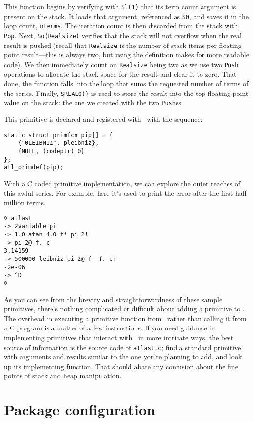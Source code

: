 \documentclass[twocolumn]{article}
\begin{document}
This function begins by verifying with {\tt Sl(1)} that its term count
argument is present on the stack.  It loads that argument, referenced
as {\tt S0}, and saves it in the loop count, {\tt nterms}.  The
iteration count is then discarded from the stack with {\tt Pop}.
Next, {\tt So(Realsize)} verifies that the stack will not overflow
when the real result is pushed (recall that {\tt Realsize} is the
number of stack items per floating point result---this is always two,
but using the definition makes for more readable code).  We then
immediately count on {\tt Realsize} being two as we use two {\tt Push}
operations to allocate the stack space for the result and clear it to
zero.  That done, the function falls into the loop that sums the
requested number of terms of the series.  Finally, {\tt SREAL0()} is
used to store the result into the top floating point value on the
stack: the one we created with the two {\tt Push}es.

This primitive is declared and registered with \atlast\ with the
sequence:

\begin{verbatim}
static struct primfcn pip[] = {
    {"0LEIBNIZ", pleibniz},
    {NULL, (codeptr) 0}
};
atl_primdef(pip);
\end{verbatim}

With a C coded primitive implementation, we can explore the outer
reaches of this awful series.  For example, here it's used to print
the error after the first half million terms.

\begin{verbatim}
% atlast
-> 2variable pi
-> 1.0 atan 4.0 f* pi 2!
-> pi 2@ f. c 
3.14159
-> 500000 leibniz pi 2@ f- f. cr
-2e-06
-> ^D
%
\end{verbatim}

As you can see from the brevity and straightforwardness of these
sample
primitives, there's nothing complicated or difficult about adding a
primitive to \atlast .  The overhead in executing a primitive
function from \atlast\ rather than calling it from a C program is a
matter of a few instructions.  If you need guidance in implementing
primitives that interact with \atlast\ in more intricate ways, the best
source of information is the source code of {\tt atlast.c}; find
a standard primitive with arguments and results similar to the one
you're planning to add, and look up its implementing function.  That
should abate any confusion about the fine points of stack and heap
manipulation.

\section{Package configuration}
\end{document}
